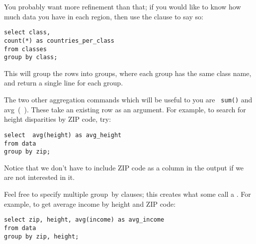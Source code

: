 
\label{crosstabs}

You probably want more refinement than that; if you would like to
know how much data you have in each region, then use the  clause to say so:
\begin{lstlisting}
select class, 
count(*) as countries_per_class
from classes
group by class;
\end{lstlisting}
This will group the rows into groups, where each group has the same
class name, and return a single line for each group.


The two other aggregation commands which will be useful to you are {\tt
sum()} and \si{avg()}. These take an existing row as an argument.
For example, to search for height disparities by ZIP code, try:
\begin{lstlisting}
select  avg(height) as avg_height
from data
group by zip;
\end{lstlisting}
Notice that we don't have to include ZIP code as a column in the output
if we are not interested in it.


Feel free to specify multiple \si{group by} clauses; this creates what
some call a . For example, to get average income by
height and ZIP code: 
\begin{lstlisting}
select zip, height, avg(income) as avg_income
from data
group by zip, height;
\end{lstlisting}


